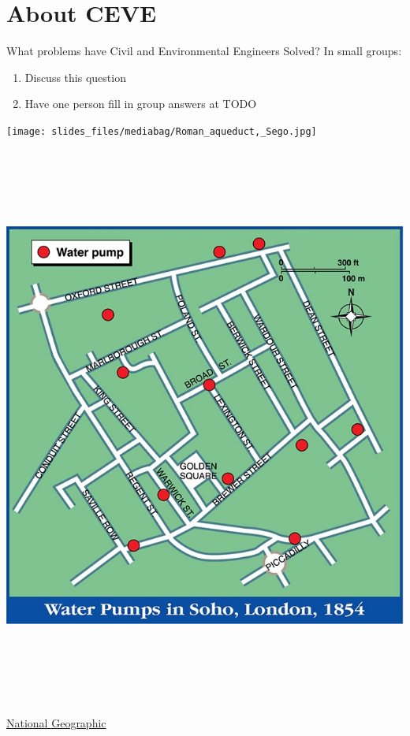 \documentclass[
  ignorenonframetext,
]{beamer}
\providecommand{\tightlist}{%
  \setlength{\itemsep}{0pt}\setlength{\parskip}{0pt}}\usepackage{longtable,booktabs,array}
\begin{document}
\section{About CEVE}\label{about-ceve}

\begin{frame}{What problems have Civil and Environmental Engineers
Solved?}
\label{what-problems-have-civil-and-environmental-engineers-solved}
In small groups:

\begin{enumerate}
\tightlist
\item
  Discuss this question
\item
  Have one person fill in group answers at TODO
\end{enumerate}
\end{frame}

\begin{frame}{}
\label{section}
\texttt{[image: slides\_files/mediabag/Roman\_aqueduct,\_Sego.jpg]}
\end{frame}

\begin{frame}{}
\label{section-1}
\includegraphics[width=\textwidth,height=7.29167in]{cholera.jpg}

\href{https://education.nationalgeographic.org/resource/mapping-a-london-epidemic/}{National
Geographic}
\end{frame}
\end{document}
